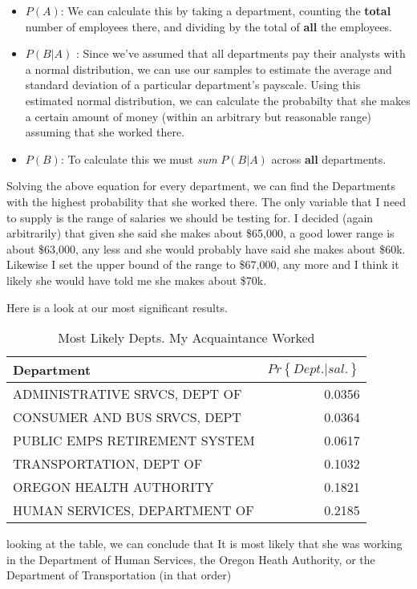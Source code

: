 \documentclass[letterpaper]{article}
\theoremstyle{definition}
\begin{document}
\begin{itemize}
	\item 
		$P(A)$: We can calculate this by taking a department, counting the \textbf{total}
		number of employees there, and dividing by the total of \textbf{all} the
		employees.
	\item
		$P(B|A)$ : Since we've assumed that all departments pay their analysts with a
		normal distribution, we can use our samples to estimate the average and standard
		deviation of a particular department's payscale. Using this estimated normal
		distribution,  we can calculate the probabilty that she makes a certain amount of
		money (within an arbitrary but reasonable range)  assuming that she worked there.
	\item
		$P(B)$: To calculate this we must \emph{sum} $P(B|A)$ across  \textbf{all}
		departments.
\end{itemize}

Solving the above equation for every department, we can find the Departments with the
highest probability that she worked there. The only variable that I need to supply is the
range of salaries we should be testing for. I decided (again arbitrarily) that given she
said she makes about \$65,000, a good lower range is about \$63,000, any less and she
would probably have said she makes about \$60k. Likewise I set the upper bound of the
range to \$67,000, any more and I think it likely she would have told me she makes about
\$70k.

Here is a look at our most significant results.

\begin{table}[h]
	\center
	\caption{Most Likely Depts. My Acquaintance Worked }
	\label{tab:2}
	\begin{tabular}{lr}
  Department & $Pr\left\{ Dept. | sal. \right\} $\\
\hline
	 ADMINISTRATIVE SRVCS, DEPT OF & 0.0356\\
	 CONSUMER AND BUS SRVCS, DEPT  & 0.0364\\
	 PUBLIC EMPS RETIREMENT SYSTEM & 0.0617\\
	 TRANSPORTATION, DEPT OF       & 0.1032\\
	 OREGON HEALTH AUTHORITY       & 0.1821\\
	 HUMAN SERVICES, DEPARTMENT OF & 0.2185\\
\end{tabular}
\end{table}

looking at the table, we can conclude that It is most likely that she was working in the
Department of Human Services, the Oregon Heath Authority, or the Department of
Transportation (in that order)
\end{document}
